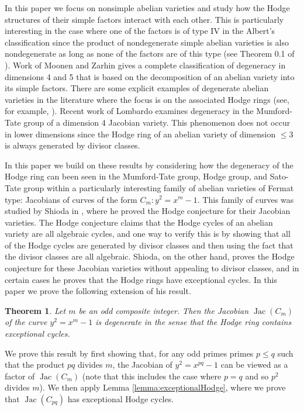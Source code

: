 \documentclass[reqno, oneside, 12pt]{amsart}
\DeclareMathOperator{\Jac}{Jac}
\newtheorem{theorem}{Theorem}[section]
\theoremstyle{remark}
\numberwithin{equation}{section}
\begin{document}
In this paper we focus on nonsimple abelian varieties and study how the Hodge structures of their simple factors interact with each other. This is particularly interesting in the case where one of the factors is of type IV in the Albert's classification since the product of nondegenerate simple abelian varieties is also nondegenerate as long as none of the factors are of this type (see Theorem 0.1 of \cite{Hazama89}). Work of Moonen and Zarhin \cite{MoonenZarhin99} gives a complete classification of degeneracy in dimensions 4 and 5 that is based on the decomposition of an abelian variety into its simple factors. There are some explicit examples of degenerate abelian varieties in the literature where the focus is on the associated Hodge rings (see, for example, \cite{Aoki2002, Pohlmann1968, Shioda82}). Recent work of Lombardo \cite{Lombardo2021} examines degeneracy in the Mumford-Tate group of a dimension 4 Jacobian variety. This phenomenon does not occur in lower dimensions since the Hodge ring of an abelian variety of dimension $\leq 3$ is always generated by divisor classes.

In this paper we build on these results by considering how the degeneracy of the Hodge ring can been seen in the Mumford-Tate group,  Hodge group, and  Sato-Tate group within a particularly interesting family of abelian varieties of Fermat type: Jacobians of curves of the form $C_m\colon y^2=x^m-1$. This family of curves was studied by Shioda in \cite{Shioda82}, where he proved the Hodge conjecture for their Jacobian varieties. The Hodge conjecture claims that the Hodge cycles of an abelian variety are all algebraic cycles, and one way to verify this is by showing that all of the Hodge cycles are generated by divisor classes  and then using the fact that the divisor classes are all algebraic. Shioda, on the other hand, proves the Hodge conjecture for these Jacobian varieties without appealing to divisor classes, and in certain cases he proves that the Hodge rings have exceptional cycles. In this paper we prove the following extension of his result.



\begin{theorem}\label{thm:degeneracyxm}
Let $m$ be an odd composite integer. Then the Jacobian $\Jac(C_m)$ of the curve $y^2=x^m-1$ is degenerate in the sense that the Hodge ring contains exceptional cycles.
\end{theorem}
We prove this result by first showing that, for any odd primes primes $p\leq q$ such that the product $pq$ divides $m$, the Jacobian of $y^2=x^{pq}-1$ can be viewed as a factor of $\Jac(C_m)$ (note that this includes the case where $p=q$ and so $p^2$ divides $m$). We then apply Lemma \ref{lemma:exceptionalHodge}, where we prove that $\Jac(C_{pq})$ has exceptional Hodge cycles.
\end{document}
